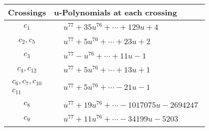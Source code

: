 \documentclass[1p]{elsarticle_modified}
\theoremstyle{definition}
\begin{document}
\begin{tabular}{m{50pt}|m{274pt}}
Crossings & \hspace{64pt}u-Polynomials at each crossing \\
\hline $$\begin{aligned}c_{1}\end{aligned}$$&$\begin{aligned}
&u^{77}+35 u^{76}+\cdots+129 u+4
\end{aligned}$\\
\hline $$\begin{aligned}c_{2},c_{5}\end{aligned}$$&$\begin{aligned}
&u^{77}+5 u^{76}+\cdots+23 u+2
\end{aligned}$\\
\hline $$\begin{aligned}c_{3}\end{aligned}$$&$\begin{aligned}
&u^{77}- u^{76}+\cdots+11 u-1
\end{aligned}$\\
\hline $$\begin{aligned}c_{4},c_{12}\end{aligned}$$&$\begin{aligned}
&u^{77}+5 u^{76}+\cdots+13 u+1
\end{aligned}$\\
\hline $$\begin{aligned}c_{6},c_{7},c_{10}\\c_{11}\end{aligned}$$&$\begin{aligned}
&u^{77}+5 u^{76}+\cdots-21 u-1
\end{aligned}$\\
\hline $$\begin{aligned}c_{8}\end{aligned}$$&$\begin{aligned}
&u^{77}+19 u^{76}+\cdots-1017075 u-2694247
\end{aligned}$\\
\hline $$\begin{aligned}c_{9}\end{aligned}$$&$\begin{aligned}
&u^{77}+11 u^{76}+\cdots-34199 u-5203
\end{aligned}$\\
\hline
\end{tabular}\\~\\
\end{document}
